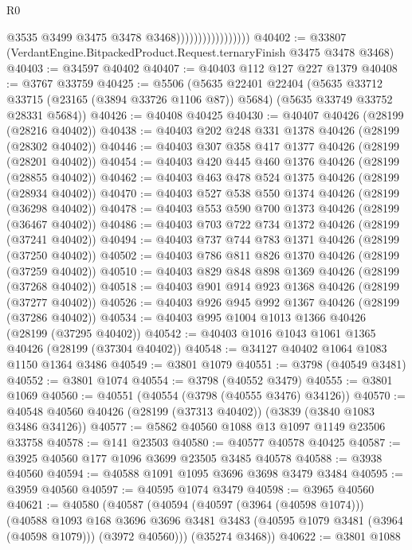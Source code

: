 \begin{lexlean}{R0}
\begin{coremodule}
                                      @3535
                                      @3499
                                      @3475
                                      @3478
                                      @3468)))))))))))))))))
@40402 := @33807 (VerdantEngine.BitpackedProduct.Request.ternaryFinish @3475 @3478 @3468)
@40403 := @34597 @40402
@40407 := @40403 @112 @127 @227 @1379
@40408 := @3767 @33759
@40425 := @5506
    (@5635
      @22401
      @22404
      (@5635 @33712 @33715 (@23165 (@3894 @33726 @1106 @87)) @5684)
      (@5635 @33749 @33752 @28331 @5684))
@40426 := @40408 @40425
@40430 := @40407 @40426 (@28199 (@28216 @40402))
@40438 := @40403 @202 @248 @331 @1378 @40426 (@28199 (@28302 @40402))
@40446 := @40403 @307 @358 @417 @1377 @40426 (@28199 (@28201 @40402))
@40454 := @40403 @420 @445 @460 @1376 @40426 (@28199 (@28855 @40402))
@40462 := @40403 @463 @478 @524 @1375 @40426 (@28199 (@28934 @40402))
@40470 := @40403 @527 @538 @550 @1374 @40426 (@28199 (@36298 @40402))
@40478 := @40403 @553 @590 @700 @1373 @40426 (@28199 (@36467 @40402))
@40486 := @40403 @703 @722 @734 @1372 @40426 (@28199 (@37241 @40402))
@40494 := @40403 @737 @744 @783 @1371 @40426 (@28199 (@37250 @40402))
@40502 := @40403 @786 @811 @826 @1370 @40426 (@28199 (@37259 @40402))
@40510 := @40403 @829 @848 @898 @1369 @40426 (@28199 (@37268 @40402))
@40518 := @40403 @901 @914 @923 @1368 @40426 (@28199 (@37277 @40402))
@40526 := @40403 @926 @945 @992 @1367 @40426 (@28199 (@37286 @40402))
@40534 := @40403 @995 @1004 @1013 @1366 @40426 (@28199 (@37295 @40402))
@40542 := @40403 @1016 @1043 @1061 @1365 @40426 (@28199 (@37304 @40402))
@40548 := @34127 @40402 @1064 @1083 @1150 @1364 @3486
@40549 := @3801 @1079
@40551 := @3798 (@40549 @3481)
@40552 := @3801 @1074
@40554 := @3798 (@40552 @3479)
@40555 := @3801 @1069
@40560 := @40551 (@40554 (@3798 (@40555 @3476) @34126))
@40570 := @40548 @40560 @40426 (@28199 (@37313 @40402)) (@3839 (@3840 @1083 @3486 @34126))
@40577 := @5862 @40560 @1088 @13 @1097 @1149 @23506 @33758
@40578 := @141 @23503
@40580 := @40577 @40578 @40425
@40587 := @3925 @40560 @177 @1096 @3699 @23505 @3485 @40578
@40588 := @3938 @40560
@40594 := @40588 @1091 @1095 @3696 @3698 @3479 @3484
@40595 := @3959 @40560
@40597 := @40595 @1074 @3479
@40598 := @3965 @40560
@40621 := @40580
    (@40587
      (@40594
        (@40597 (@3964 (@40598 @1074)))
        (@40588
          @1093
          @168
          @3696
          @3696
          @3481
          @3483
          (@40595 @1079 @3481 (@3964 (@40598 @1079)))
          (@3972 @40560)))
      (@35274 @3468))
@40622 := @3801 @1088

\end{coremodule}
\end{lexlean}
